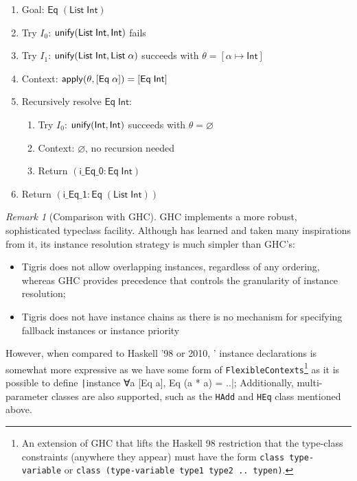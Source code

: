 \documentclass[a4paper, 11pt]{article}
\theoremstyle{remark}\newtheorem*{remark}{Remark}
\theoremstyle{definition}\newtheorem*{definition}{Definition}
\begin{document}
\begin{enumerate}
\item Goal: $\mathsf{Eq}\;(\mathsf{List}\;\mathsf{Int})$
\item Try $I_0$:  $\mathsf{unify}(\mathsf{List}\;\mathsf{Int}, \mathsf{Int})$ fails
\item Try $I_1$: $\mathsf{unify}(\mathsf{List}\;\mathsf{Int}, \mathsf{List}\;\alpha)$ succeeds with $\theta = [\alpha \mapsto \mathsf{Int}]$
\item Context: $\mathsf{apply}(\theta, [\mathsf{Eq}\;\alpha]) = [\mathsf{Eq}\;\mathsf{Int}]$
\item Recursively resolve $\mathsf{Eq}\;\mathsf{Int}$:
  \begin{enumerate}
    \item Try $I_0$: $\mathsf{unify}(\mathsf{Int}, \mathsf{Int})$ succeeds with $\theta = \varnothing$
    \item Context: $\varnothing$, no recursion needed
    \item Return $(\mathsf{i\_Eq\_0} : \mathsf{Eq}\;\mathsf{Int})$
  \end{enumerate}
\item Return $(\mathsf{i\_Eq\_1} :  \mathsf{Eq}\;(\mathsf{List}\;\mathsf{Int}))$
\end{enumerate}

\begin{remark}[Comparison with GHC]
GHC implements a more robust, sophisticated typeclass facility. Although \Tigris has learned and taken
many inspirations from it, its instance resolution strategy is much simpler than GHC's:
\begin{itemize}
  \item Tigris does not allow overlapping instances, regardless of any ordering, whereas GHC
    provides precedence that controls the granularity of instance resolution;
  \item Tigris does not have instance chains as there is no mechanism for specifying fallback
    instances or instance priority
\end{itemize}
However, when compared to Haskell '98 or 2010,
\Tigris' instance declarations is somewhat more expressive as
we have some form of \texttt{FlexibleContexts}\footnote{
  An extension of GHC that lifts the Haskell 98 restriction
  that the type-class constraints (anywhere they appear) must have the form
  \texttt{class type-variable} or \texttt{class (type-variable type1 type2 .. typen)}.
}
as it is possible to define
\texttt|instance ∀a [Eq a], Eq (a * a) = ..|; Additionally, multi-parameter
classes are also supported, such as the \texttt{HAdd} and \texttt{HEq} class mentioned above.

\end{remark}
\end{document}
